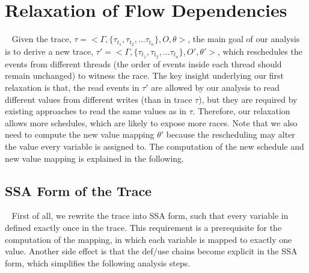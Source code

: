 \section{Relaxation of Flow Dependencies}~\label{sec:relax1}
Given the trace, $\tau=<\Gamma , \{\tau_{t_1}, \tau_{t_2}, \dots \tau_{t_n} \}, O, \theta>$, the main goal of our analysis is to derive a new trace,  $\tau'=<\Gamma , \{\tau_{t_1}, \tau_{t_2}, \dots \tau_{t_n} \}, O', \theta'>$, which reschedules the events from different threads (the order of events inside each thread should remain unchanged) to witness the race. The key insight underlying our first relaxation is that, the read events in $\tau'$ are allowed by our analysis to read different values from different writes (than in trace $\tau$), but they are required by existing approaches to read the same values as in $\tau$. Therefore, our relaxation allows more schedules, which are likely to expose more races. Note that we also need to compute the new value mapping $\theta'$ because the rescheduling may alter the value every variable is assigned to. The computation of the new schedule and new value mapping is explained in the following.







\subsection{SSA Form of the Trace}~\label{sec:ssa}
First of all, we rewrite the trace into SSA form, such that every variable in defined exactly once in the trace. This requirement is a prerequisite for the computation of the mapping, in which each variable is mapped to exactly one value. Another side effect is that the def/use chains become explicit in the SSA form, which simplifies the following analysis steps.

